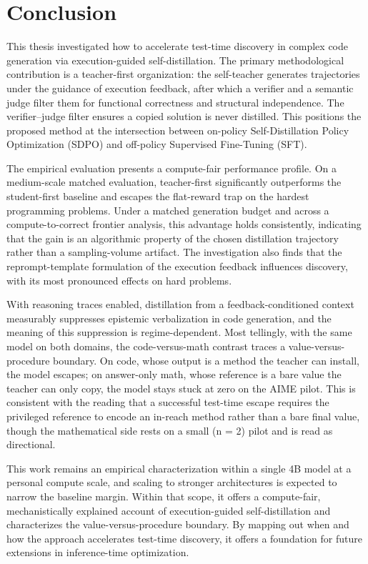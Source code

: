 \chapter{Conclusion}\label{chapter-7-conclusion}

This thesis investigated how to accelerate test-time discovery in complex code generation via execution-guided self-distillation. The primary methodological contribution is a teacher-first organization: the self-teacher generates trajectories under the guidance of execution feedback, after which a verifier and a semantic judge filter them for functional correctness and structural independence. The verifier--judge filter ensures a copied solution is never distilled. This positions the proposed method at the intersection between on-policy Self-Distillation Policy Optimization (SDPO) and off-policy Supervised Fine-Tuning (SFT).

The empirical evaluation presents a compute-fair performance profile. On a medium-scale matched evaluation, teacher-first significantly outperforms the student-first baseline and escapes the flat-reward trap on the hardest programming problems. Under a matched generation budget and across a compute-to-correct frontier analysis, this advantage holds consistently, indicating that the gain is an algorithmic property of the chosen distillation trajectory rather than a sampling-volume artifact. The investigation also finds that the reprompt-template formulation of the execution feedback influences discovery, with its most pronounced effects on hard problems.

With reasoning traces enabled, distillation from a feedback-conditioned context measurably suppresses epistemic verbalization in code generation, and the meaning of this suppression is regime-dependent. Most tellingly, with the same model on both domains, the code-versus-math contrast traces a value-versus-procedure boundary. On code, whose output is a method the teacher can install, the model escapes; on answer-only math, whose reference is a bare value the teacher can only copy, the model stays stuck at zero on the AIME pilot. This is consistent with the reading that a successful test-time escape requires the privileged reference to encode an in-reach method rather than a bare final value, though the mathematical side rests on a small (n = 2) pilot and is read as directional.

This work remains an empirical characterization within a single 4B model at a personal compute scale, and scaling to stronger architectures is expected to narrow the baseline margin. Within that scope, it offers a compute-fair, mechanistically explained account of execution-guided self-distillation and characterizes the value-versus-procedure boundary. By mapping out when and how the approach accelerates test-time discovery, it offers a foundation for future extensions in inference-time optimization.
